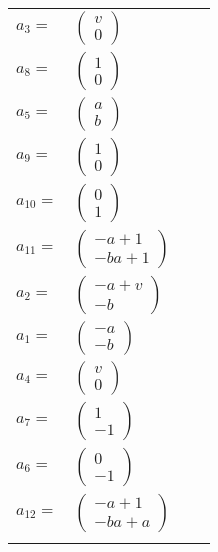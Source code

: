 \documentclass[1p]{elsarticle_modified}
\theoremstyle{definition}
\begin{document}
\begin{tabular}{m{7pt} m{180pt} m{7pt} m{180pt} }
\flushright $a_{3}=$&$\begin{pmatrix}v\\0\end{pmatrix}$ \\
\flushright $a_{8}=$&$\begin{pmatrix}1\\0\end{pmatrix}$ \\
\flushright $a_{5}=$&$\begin{pmatrix}a\\b\end{pmatrix}$ \\
\flushright $a_{9}=$&$\begin{pmatrix}1\\0\end{pmatrix}$ \\
\flushright $a_{10}=$&$\begin{pmatrix}0\\1\end{pmatrix}$ \\
\flushright $a_{11}=$&$\begin{pmatrix}- a+1\\- b a+1\end{pmatrix}$ \\
\flushright $a_{2}=$&$\begin{pmatrix}- a+v\\- b\end{pmatrix}$ \\
\flushright $a_{1}=$&$\begin{pmatrix}- a\\- b\end{pmatrix}$ \\
\flushright $a_{4}=$&$\begin{pmatrix}v\\0\end{pmatrix}$ \\
\flushright $a_{7}=$&$\begin{pmatrix}1\\-1\end{pmatrix}$ \\
\flushright $a_{6}=$&$\begin{pmatrix}0\\-1\end{pmatrix}$ \\
\flushright $a_{12}=$&$\begin{pmatrix}- a+1\\- b a+a\end{pmatrix}$\\&\end{tabular}
\end{document}
